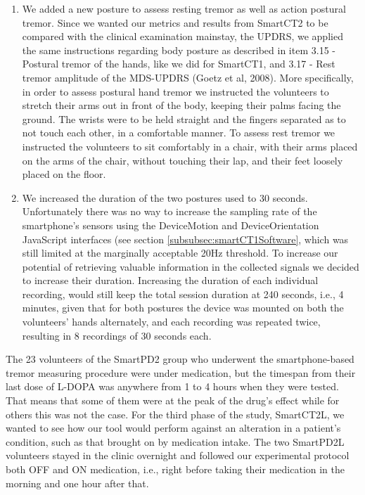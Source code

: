 \begin{enumerate}
\item We added a new posture to assess resting tremor as well as action postural tremor. Since we wanted our metrics and results from \gls{SmartCT2} to be compared with the clinical examination mainstay, the \gls{UPDRS}, we applied the same instructions regarding body posture as described in item 3.15 - Postural tremor of the hands, like we did for \gls{SmartCT1}, and  3.17 - Rest tremor amplitude of the \gls{MDS}-\gls{UPDRS} (Goetz et al, 2008). More specifically, in order to assess postural hand tremor we instructed the volunteers to stretch their arms out in front of the body, keeping their palms facing the ground. The wrists were to be held straight and the fingers separated as to not touch each other, in a comfortable manner. To assess rest tremor we instructed the volunteers to sit comfortably in a chair, with their arms placed on the arms of the chair, without touching their lap, and their feet loosely placed on the floor.
\item We increased the duration of the two postures used to 30 seconds. Unfortunately there was no way to increase the sampling rate of the smartphone's sensors using the DeviceMotion and DeviceOrientation JavaScript interfaces (see section \ref{subsubsec:smartCT1Software}, which was still limited at the marginally acceptable 20Hz threshold. To increase our potential of retrieving valuable information in the collected signals we decided to increase their duration. Increasing the duration of each individual recording, would still keep the total session duration at 240 seconds, i.e., 4 minutes, given that for both postures the device was mounted on both the volunteers' hands alternately, and each recording was repeated twice, resulting in 8 recordings of 30 seconds each.
\end{enumerate}

\noindent
The 23 volunteers of the \gls{SmartPD2} group who underwent the smartphone-based tremor measuring procedure were under medication, but the timespan from their last dose of L-DOPA was anywhere from 1 to 4 hours when they were tested. That means that some of them were at the peak of the drug’s effect while for others this was not the case. For the third phase of the study, \gls{SmartCT2L}, we wanted to see how our tool would perform against an alteration in a patient's condition, such as that brought on by medication intake. The two \gls{SmartPD2L} volunteers stayed in the clinic overnight and followed our experimental protocol both OFF and ON medication, i.e., right before taking their medication in the morning and one hour after that. 

